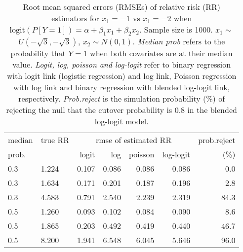 \documentclass[12pt,a4paper]{article}
\begin{document}
\begin{table}[H] 
\small\sf\centering 
\caption{Root mean squared errors (RMSEs) of relative risk (RR) estimators for $x_1=-1$ vs $x_1=-2$ when $\mbox{logit}(P[Y=1])=\alpha+\beta_1 x_1 + \beta_2 x_2$. Sample size is 1000. $x_1 \sim $$U(-\sqrt{3},-\sqrt{3})$, $x_2 \sim N(0,1)$. {\it Median prob} refers to the probability that $Y=1$ when both covariates are at their median value. {\it Logit, log, poisson and log-logit} refer to binary regression with logit link (logistic regression) and log link, Poisson regression with log link and binary regression with blended log-logit link, respectively. {\it Prob.reject} is the simulation probability (\%) of rejecting the null that the cutover probability is $0.8$ in the blended log-logit model.} 
\begin{tabular}{llrrrrr} 
\toprule 
median & true RR & \multicolumn{4}{c}{rmse of estimated RR} & prob.reject \\ 
prob. & & logit & log & poisson & log-logit  & (\%) \\ \midrule 
0.3 & 1.224 & 0.107 & 0.086 & 0.086 & 0.086 &  0.0 \\  
0.3 & 1.634 & 0.171 & 0.201 & 0.187 & 0.196 &  2.8 \\  
0.3 & 4.583 & 0.791 & 2.540 & 2.239 & 2.319 & 84.3 \\  
0.5 & 1.260 & 0.093 & 0.102 & 0.084 & 0.090 &  8.6 \\  
0.5 & 1.865 & 0.203 & 0.492 & 0.419 & 0.440 & 46.7 \\  
0.5 & 8.200 & 1.941 & 6.548 & 6.045 & 5.646 & 96.0 \\  
\bottomrule 
\end{tabular} 
\end{table} 
\end{document}
